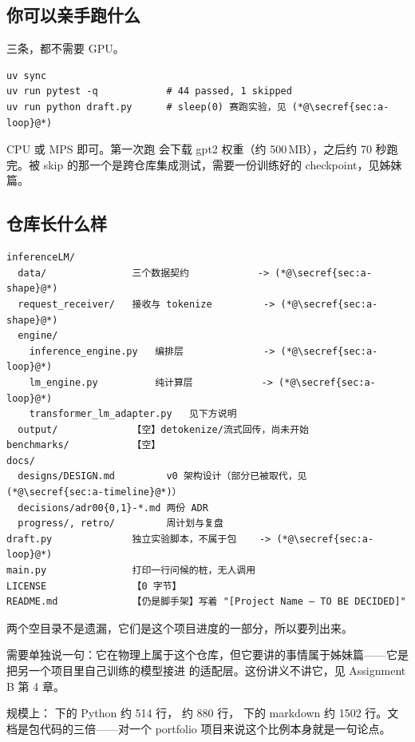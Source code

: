 \subsection{你可以亲手跑什么}
\label{sec:a-run}

三条，都不需要 GPU。

\begin{lstlisting}[style=hlshell]
uv sync
uv run pytest -q            # 44 passed, 1 skipped
uv run python draft.py      # sleep(0) 赛跑实验，见 (*@\secref{sec:a-loop}@*)
\end{lstlisting}

\resources CPU 或 MPS 即可。第一次跑  会下载 gpt2 权重（约 500\,MB），之后约 70 秒跑完。被 skip 的那一个是跨仓库集成测试，需要一份训练好的 checkpoint，见姊妹篇。

\subsection{仓库长什么样}
\label{sec:a-layout}

\begin{lstlisting}[style=hlrepl]
inferenceLM/
  data/               三个数据契约            -> (*@\secref{sec:a-shape}@*)
  request_receiver/   接收与 tokenize         -> (*@\secref{sec:a-shape}@*)
  engine/
    inference_engine.py   编排层              -> (*@\secref{sec:a-loop}@*)
    lm_engine.py          纯计算层            -> (*@\secref{sec:a-loop}@*)
    transformer_lm_adapter.py   见下方说明
  output/             【空】detokenize/流式回传，尚未开始
benchmarks/           【空】
docs/
  designs/DESIGN.md         v0 架构设计（部分已被取代，见 (*@\secref{sec:a-timeline}@*)）
  decisions/adr00{0,1}-*.md 两份 ADR
  progress/, retro/         周计划与复盘
draft.py              独立实验脚本，不属于包    -> (*@\secref{sec:a-loop}@*)
main.py               打印一行问候的桩，无人调用
LICENSE               【0 字节】
README.md             【仍是脚手架】写着 "[Project Name — TO BE DECIDED]"
\end{lstlisting}

两个空目录不是遗漏，它们是这个项目进度的一部分，所以要列出来。

 需要单独说一句：它在物理上属于这个仓库，但它要讲的事情属于姊妹篇——它是把另一个项目里自己训练的模型接进  的适配层。这份讲义不讲它，见 Assignment B 第 4 章。

规模上： 下的 Python 约 514 行， 约 880 行， 下的 markdown 约 1502 行。文档是包代码的三倍——对一个 portfolio 项目来说这个比例本身就是一句论点。

